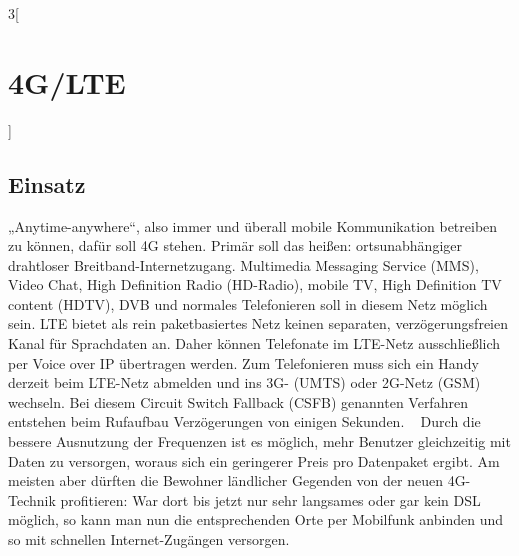 \begin{multicols}{3}[\section{4G/LTE}]
\subsection*{Einsatz}
„Anytime-anywhere“, also immer und überall mobile Kommunikation betreiben zu können, dafür soll 4G stehen. Primär soll das heißen: ortsunabhängiger drahtloser Breitband-Internetzugang. Multimedia Messaging Service (MMS), Video Chat, High Definition Radio (HD-Radio), mobile TV, High Definition TV content (HDTV), DVB und normales Telefonieren soll in diesem Netz möglich sein.
LTE bietet als rein paketbasiertes Netz keinen separaten, verzögerungsfreien Kanal für Sprachdaten an. Daher können Telefonate im LTE-Netz ausschließlich per Voice over IP übertragen werden. Zum Telefonieren muss sich ein Handy derzeit beim LTE-Netz abmelden und ins 3G- (UMTS) oder 2G-Netz (GSM) wechseln. Bei diesem Circuit Switch Fallback (CSFB) genannten Verfahren entstehen beim Rufaufbau Verzögerungen von einigen Sekunden. ~\cite{4GLTE.5}
Durch die bessere Ausnutzung der Frequenzen ist es möglich, mehr Benutzer gleichzeitig mit Daten zu versorgen, woraus sich ein geringerer Preis pro Datenpaket ergibt. 
Am meisten aber dürften die Bewohner ländlicher Gegenden von der neuen 4G-Technik profitieren: War dort bis jetzt nur sehr langsames oder gar kein DSL möglich, so kann man nun die entsprechenden Orte per Mobilfunk anbinden und so mit schnellen Internet-Zugängen versorgen. ~\cite{4GLTE.6}

\end{multicols}
\newpage

